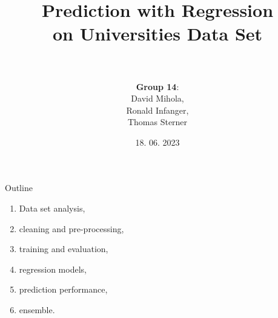 \documentclass{beamer} %
\title[Prediction with Regression on Universities Data Set]{Prediction with Regression\\on Universities Data Set\\\normalsize \\}
\author{\textbf{Group 14}: \\David Mihola, \\Ronald Infanger, \\Thomas Sterner}
\date{18. 06. 2023}
\begin{document}
\begin{frame}
  \maketitle
\end{frame}

\begin{frame}{Outline}
  \vspace{-1cm}
  \begin{enumerate}
      \item Data set analysis,
      \item cleaning and pre-processing,
      \item training and evaluation,
      \item regression models,
      \item prediction performance,
      \item ensemble.
  \end{enumerate}
\end{frame}
\end{document}
